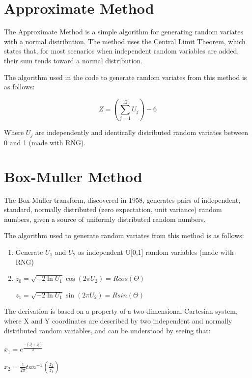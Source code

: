 \documentclass{article}
\begin{document}
\section{Approximate Method}

The Approximate Method is a simple algorithm for generating random variates with a normal distribution. The method uses the Central Limit Theorem, which states that, for most scenarios when independent random variables are added, their sum tends toward a normal distribution\cite{Central}.

The algorithm used in the code to generate random variates from this method is as follows:

\begin{equation}
Z = (\sum_{j=1}^{12}{U_j}) - 6 
\end{equation}

Where $U_j$ are independently and identically distributed random variates between 0 and 1 (made with RNG).





\section{Box-Muller Method}

The Box-Muller transform, discovered in 1958, generates pairs of independent, standard, normally distributed (zero expectation, unit variance) random numbers, given a source of uniformly distributed random numbers\cite{Box-Muller}.

The algorithm used to generate random variates from this method is as follows:

\begin{enumerate}
\item 
Generate $U_1$ and $U_2$ as independent U[0,1] random variables (made with RNG)
\item 
$z_{0}=\sqrt{-2\ln U_{1}}\cos(2\pi U_{2}) = Rcos(\Theta)$

$z_{1}=\sqrt{-2\ln U_{1}}\sin(2\pi U_{2}) = Rsin(\Theta)$
\end{enumerate} 

The derivation is based on a property of a two-dimensional Cartesian system, where X and Y coordinates are described by two independent and normally distributed random variables, and can be understood by seeing that:

$x_1	= e^{\frac{-(z_1^2+z_2^2)}{2}}$

$x_2	= \frac{1}{2\pi}tan^{-1}(\frac{z_2}{z_1})$
\end{document}
